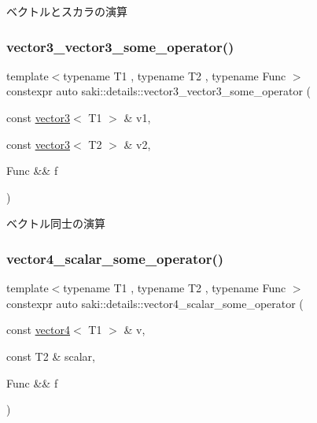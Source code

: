 ベクトルとスカラの演算 

\mbox{\label{namespacesaki_1_1details_a2febe2ef2ca8b6222cd2edd5c82863ad}} 
\subsubsection{\texorpdfstring{vector3\+\_\+vector3\+\_\+some\+\_\+operator()}{vector3\_vector3\_some\_operator()}}
{\footnotesize\ttfamily template$<$typename T1 , typename T2 , typename Func $>$ \\
constexpr auto saki\+::details\+::vector3\+\_\+vector3\+\_\+some\+\_\+operator (\begin{DoxyParamCaption}\item[{const \mbox{\hyperlink{classsaki_1_1vector3}{vector3}}$<$ T1 $>$ \&}]{v1,  }\item[{const \mbox{\hyperlink{classsaki_1_1vector3}{vector3}}$<$ T2 $>$ \&}]{v2,  }\item[{Func \&\&}]{f }\end{DoxyParamCaption})}



ベクトル同士の演算 

\mbox{\label{namespacesaki_1_1details_abda7a9b7cd977b6a1e866891e695a60a}} 
\subsubsection{\texorpdfstring{vector4\+\_\+scalar\+\_\+some\+\_\+operator()}{vector4\_scalar\_some\_operator()}}
{\footnotesize\ttfamily template$<$typename T1 , typename T2 , typename Func $>$ \\
constexpr auto saki\+::details\+::vector4\+\_\+scalar\+\_\+some\+\_\+operator (\begin{DoxyParamCaption}\item[{const \mbox{\hyperlink{classsaki_1_1vector4}{vector4}}$<$ T1 $>$ \&}]{v,  }\item[{const T2 \&}]{scalar,  }\item[{Func \&\&}]{f }\end{DoxyParamCaption})}



